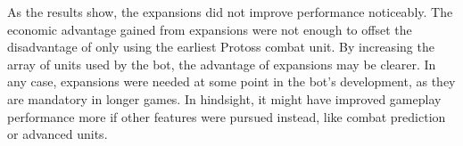 	As the results show, the expansions did not improve performance noticeably. The economic advantage gained from expansions were not enough to offset the disadvantage of only using the earliest Protoss combat unit. By increasing the array of units used by the bot, the advantage of expansions may be clearer. In any case, expansions were needed at some point in the bot's development, as they are mandatory in longer games. In hindsight, it might have improved gameplay performance more if other features were pursued instead, like combat prediction or advanced units.